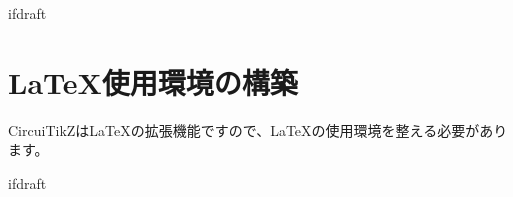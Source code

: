 \expandafter\ifx\csname ifdraft\endcsname\relax
    
	
\fi

\chapter{\LaTeX 使用環境の構築}
	CircuiTikZは\LaTeX の拡張機能ですので、\LaTeX の使用環境を整える必要があります。
	
	

\expandafter\ifx\csname ifdraft\endcsname\relax
	
\fi